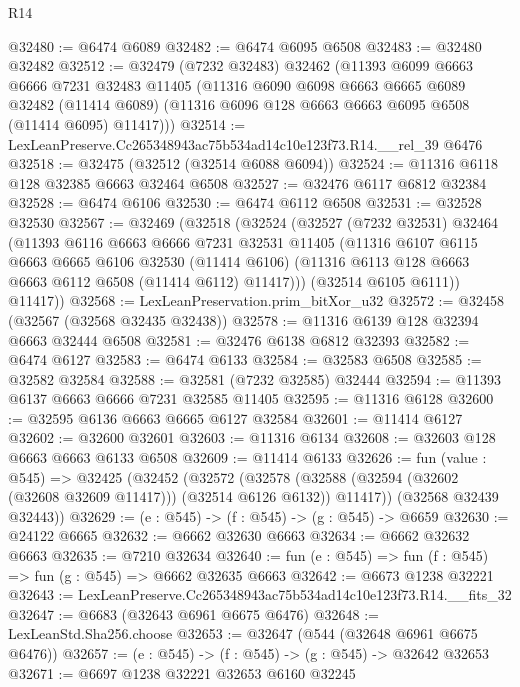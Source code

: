 \begin{lexlean}{R14}
\begin{coremodule}
@32480 := @6474 @6089
@32482 := @6474 @6095 @6508
@32483 := @32480 @32482
@32512 := @32479
    (@7232 @32483)
    @32462
    (@11393
      @6099
      @6663
      @6666
      @7231
      @32483
      @11405
      (@11316
        @6090
        @6098
        @6663
        @6665
        @6089
        @32482
        (@11414 @6089)
        (@11316 @6096 @128 @6663 @6663 @6095 @6508 (@11414 @6095) @11417)))
@32514 := LexLeanPreserve.Cc265348943ac75b534ad14c10e123f73.R14.__rel_39 @6476
@32518 := @32475 (@32512 (@32514 @6088 @6094))
@32524 := @11316 @6118 @128 @32385 @6663 @32464 @6508
@32527 := @32476 @6117 @6812 @32384
@32528 := @6474 @6106
@32530 := @6474 @6112 @6508
@32531 := @32528 @32530
@32567 := @32469
    (@32518
      (@32524
        (@32527
          (@7232 @32531)
          @32464
          (@11393
            @6116
            @6663
            @6666
            @7231
            @32531
            @11405
            (@11316
              @6107
              @6115
              @6663
              @6665
              @6106
              @32530
              (@11414 @6106)
              (@11316 @6113 @128 @6663 @6663 @6112 @6508 (@11414 @6112) @11417)))
          (@32514 @6105 @6111))
        @11417))
@32568 := LexLeanPreservation.prim_bitXor_u32
@32572 := @32458 (@32567 (@32568 @32435 @32438))
@32578 := @11316 @6139 @128 @32394 @6663 @32444 @6508
@32581 := @32476 @6138 @6812 @32393
@32582 := @6474 @6127
@32583 := @6474 @6133
@32584 := @32583 @6508
@32585 := @32582 @32584
@32588 := @32581 (@7232 @32585) @32444
@32594 := @11393 @6137 @6663 @6666 @7231 @32585 @11405
@32595 := @11316 @6128
@32600 := @32595 @6136 @6663 @6665 @6127 @32584
@32601 := @11414 @6127
@32602 := @32600 @32601
@32603 := @11316 @6134
@32608 := @32603 @128 @6663 @6663 @6133 @6508
@32609 := @11414 @6133
@32626 := fun (value : @545) =>
  @32425
    (@32452
      (@32572
        (@32578 (@32588 (@32594 (@32602 (@32608 @32609 @11417))) (@32514 @6126 @6132)) @11417))
      (@32568 @32439 @32443))
@32629 := (e : @545) -> (f : @545) -> (g : @545) -> @6659
@32630 := @24122 @6665
@32632 := @6662 @32630 @6663
@32634 := @6662 @32632 @6663
@32635 := @7210 @32634
@32640 := fun (e : @545) => fun (f : @545) => fun (g : @545) => @6662 @32635 @6663
@32642 := @6673 @1238 @32221
@32643 := LexLeanPreserve.Cc265348943ac75b534ad14c10e123f73.R14.__fits_32
@32647 := @6683 (@32643 @6961 @6675 @6476)
@32648 := LexLeanStd.Sha256.choose
@32653 := @32647 (@544 (@32648 @6961 @6675 @6476))
@32657 := (e : @545) -> (f : @545) -> (g : @545) -> @32642 @32653
@32671 := @6697
    @1238
    @32221
    @32653
    @6160
    @32245

\end{coremodule}
\end{lexlean}
